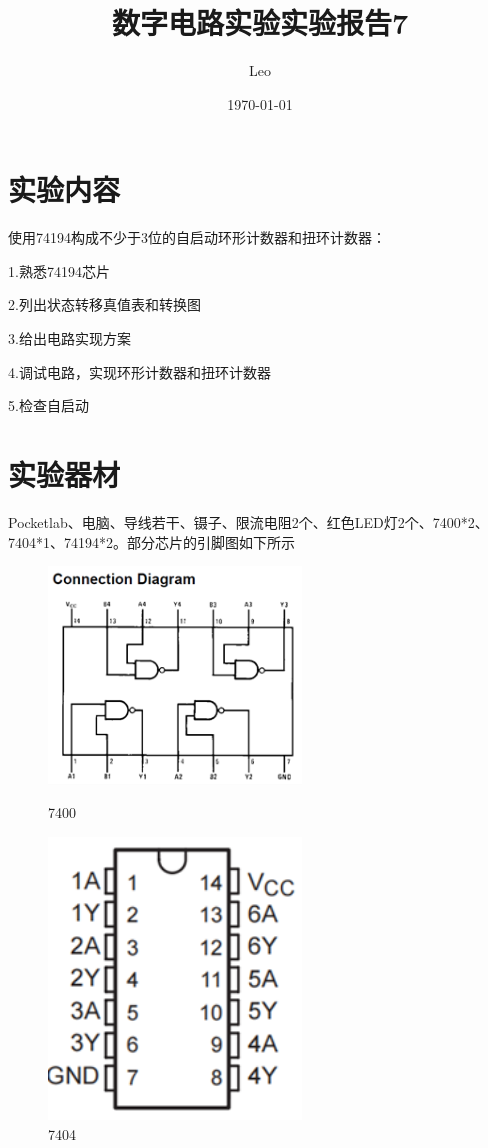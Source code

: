 \documentclass{ctexart}
\title{数字电路实验\quad 实验报告7}
\author{Leo}
\date{\today}
\begin{document}
\maketitle
\section{实验内容}
使用74194构成不少于3位的自启动环形计数器和扭环计数器：

1.熟悉74194芯片

2.列出状态转移真值表和转换图 

3.给出电路实现方案

4.调试电路，实现环形计数器和扭环计数器

5.检查自启动

\section{实验器材}
Pocketlab、电脑、导线若干、镊子、限流电阻2个、红色LED灯2个、7400*2、7404*1、74194*2。部分芯片的引脚图如下所示
\begin{figure}[H]
    \centering
    \begin{minipage}{0.5\textwidth}
    \centering
           \includegraphics[width=0.6\textwidth]{7400.png}
           \caption{7400}
    \label{}
    \end{minipage}
    \hspace{0.05\textwidth}
    \begin{minipage}{0.3\textwidth}
    \centering
           \includegraphics[width=0.6\textwidth]{7404.png}
           \caption{7404}
    \label{7474}
    \end{minipage}
\end{figure}
\end{document}

